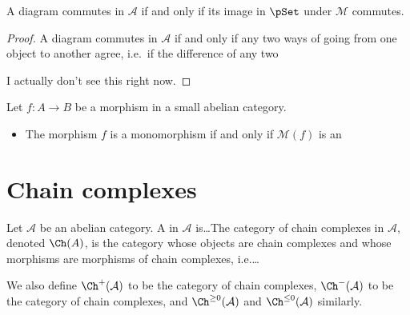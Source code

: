 \documentclass[main.tex]{subfiles}
\begin{document}
\begin{corollary}
  A diagram commutes in $\mathcal{A}$ if and only if its image in $\pSet$ under $\mathcal{M}$ commutes.
\end{corollary}
\begin{proof}
  A diagram commutes in $\mathcal{A}$ if and only if any two ways of going from one object to another agree, i.e.\ if the difference of any two

  I actually don't see this right now.
\end{proof}

\begin{lemma}
  \label{lemma:member_functor_preserves_mono_epi}
  Let $f\colon A \to B$ be a morphism in a small abelian category.
  \begin{itemize}
    \item The morphism $f$ is a monomorphism if and only if $\mathcal{M}(f)$ is an
  \end{itemize}
\end{lemma}

\section{Chain complexes}
\label{ssc:chain_complexes}

\begin{definition}
  \label{def:category_of_chain_complexes_abelian}
  Let $\mathcal{A}$ be an abelian category. A  in $\mathcal{A}$ is\dots The category of chain complexes in $\mathcal{A}$, denoted $\Ch(A)$, is the category whose objects are chain complexes and whose morphisms are morphisms of chain complexes, i.e.\dots

  We also define $\Ch^{+}(\mathcal{A})$ to be the category of  chain complexes, $\Ch^{-}(\mathcal{A})$ to be the category of  chain complexes, and $\Ch^{\geq 0}(\mathcal{A})$ and $\Ch^{\leq 0}(\mathcal{A})$ similarly.
\end{definition}
\end{document}
